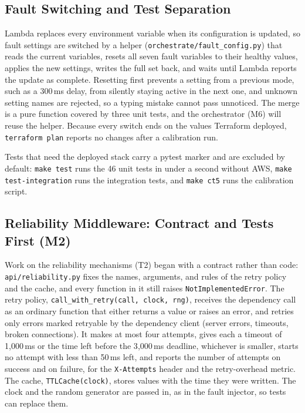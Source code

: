 \documentclass[10pt]{article}
\begin{document}
\subsection{Fault Switching and Test Separation}
Lambda replaces every environment variable when its configuration is updated,
so fault settings are switched by a helper (\texttt{orchestrate/fault\_config.py})
that reads the current variables, resets all seven fault variables to their
healthy values, applies the new settings, writes the full set back, and waits
until Lambda reports the update as complete. Resetting first prevents a setting
from a previous mode, such as a 300\,ms delay, from silently staying active in
the next one, and unknown setting names are rejected, so a typing mistake cannot
pass unnoticed. The merge is a pure function covered by three unit tests, and the
orchestrator (M6) will reuse the helper. Because every switch ends on the values
Terraform deployed, \texttt{terraform plan} reports no changes after a
calibration run.

Tests that need the deployed stack carry a pytest marker and are excluded by
default: \texttt{make test} runs the 46 unit tests in under a second without
AWS, \texttt{make test-integration} runs the integration tests, and
\texttt{make ct5} runs the calibration script.

\subsection{Reliability Middleware: Contract and Tests First (M2)}
Work on the reliability mechanisms (T2) began with a contract rather than code:
\texttt{api/reliability.py} fixes the names, arguments, and rules of the retry
policy and the cache, and every function in it still raises
\texttt{NotImplementedError}. The retry policy, \texttt{call\_with\_retry(call,
clock, rng)}, receives the dependency call as an ordinary function that either
returns a value or raises an error, and retries only errors marked retryable by
the dependency client (server errors, timeouts, broken connections). It makes at
most four attempts, gives each a timeout of 1{,}000\,ms or the time left before
the 3{,}000\,ms deadline, whichever is smaller, starts no attempt with less than
50\,ms left, and reports the number of attempts on success and on failure, for
the \texttt{X-Attempts} header and the retry-overhead metric. The cache,
\texttt{TTLCache(clock)}, stores values with the time they were written. The
clock and the random generator are passed in, as in the fault injector, so tests
can replace them.
\end{document}
